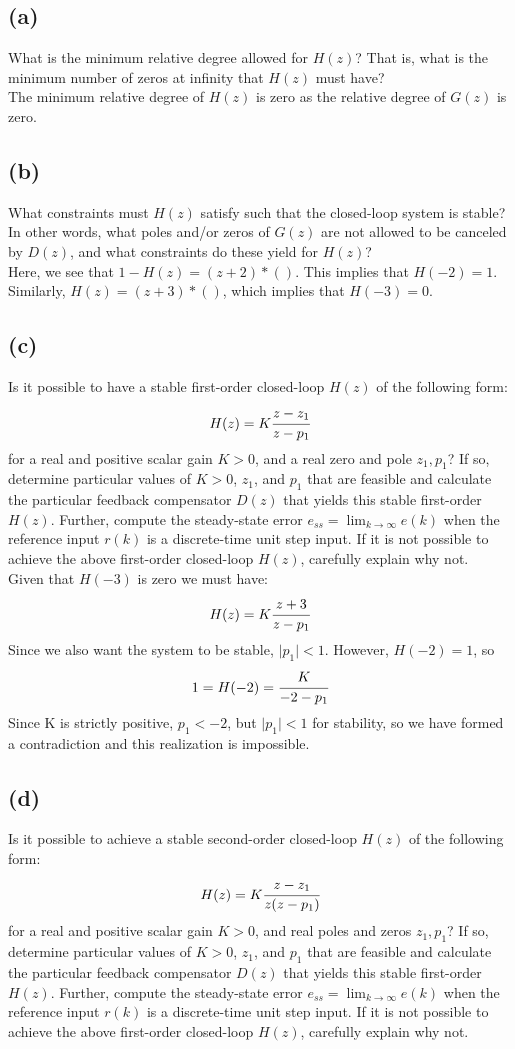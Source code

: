 \documentclass{article}
\begin{document}
\subsection*{(a)}
What is the minimum relative degree allowed for $H(z)$? That is, what is the minimum number of zeros at infinity that $H(z)$ must have?\\

The minimum relative degree of $H(z)$ is zero as the relative degree of $G(z)$ is zero.
\subsection*{(b)}
What constraints must $H(z)$ satisfy such that the closed-loop system is stable? In other words, what poles and/or zeros of $G(z)$ are not allowed to be canceled by $D(z)$, and what constraints do these yield for $H(z)$?\\

Here, we see that $1-H(z)=(z+2)*()$. This implies that $H(-2)=1$. Similarly, $H(z)=(z+3)*()$, which implies that $H(-3)=0$.
\subsection*{(c)}
Is it possible to have a stable first-order closed-loop $H(z)$ of the following form:
\[H(z)=K\cfrac{z-z_1}{z-p_1}\]
for a real and positive scalar gain $K>0$, and a real zero and pole $z_1,p_1$? If so, determine particular values of $K>0$, $z_1$, and $p_1$ that are feasible and calculate the particular feedback compensator $D(z)$ that yields this stable first-order $H(z)$. Further, compute the steady-state error $e_{ss}=\lim_{k\to\infty}e(k)$ when the reference input $r(k)$ is a discrete-time unit step input. If it is not possible to achieve the above first-order closed-loop $H(z)$, carefully explain
why not.\\

Given that $H(-3)$ is zero we must have:
\[H(z)=K\cfrac{z+3}{z-p_1}\]
Since we also want the system to be stable, $\lvert p_1\rvert<1$. However, $H(-2)=1$, so
\[1=H(-2)=\cfrac{K}{-2-p_1}\]
Since K is strictly positive, $p_1<-2$, but $\lvert p_1\rvert<1$ for stability, so we have formed a contradiction and this realization is impossible.

\subsection*{(d)}
Is it possible to achieve a stable second-order closed-loop $H(z)$ of the following form:
\[H(z)=K\cfrac{z-z_1}{z(z-p_1)}\]
for a real and positive scalar gain $K>0$, and real poles and zeros $z_1,p_1$? If so, determine particular values of $K>0$, $z_1$, and $p_1$ that are feasible and calculate the particular feedback compensator $D(z)$ that yields this stable first-order $H(z)$. Further, compute the steady-state error $e_{ss}=\lim_{k\to\infty}e(k)$ when the reference input $r(k)$ is a discrete-time unit step input. If it is not possible to achieve the above first-order closed-loop $H(z)$, carefully explain why
not.\\
\end{document}
